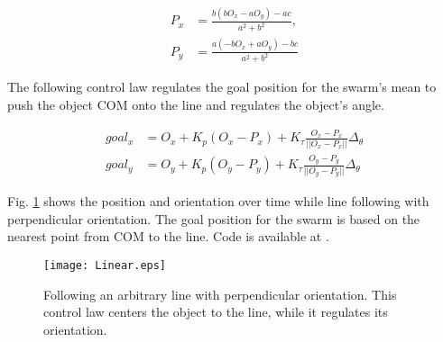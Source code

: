 
\begin{align}
P_x &= \frac{b(bO_x-aO_y)-ac}{a^2 + b^2},\\ \nonumber
P_y &= \frac{a(-bO_x+aO_y)-bc}{a^2 + b^2}
\end{align}


The following control law regulates the goal position for the swarm's mean to push the object COM onto the line and regulates the object's angle.

\begin{align}
goal_x &= O_x+ K_p (O_x-P_x)+ K_\tau \frac{O_x-P_x}{||O_x-P_x||}\Delta_{\theta} \nonumber \\
goal_y &= O_y+ K_p (O_y-P_y)+ K_\tau \frac{O_y-P_y}{||O_y-P_y||}\Delta_{\theta} \label{eq:Regulate}
\end{align}

Fig. \ref{fig:Linear} shows the position and orientation over time 
while line following with perpendicular orientation.
The goal position for the swarm is based on the nearest point from COM to the line.
 Code is available at \cite{Shahrokhi16TorqueLine}.

\begin{figure}
\begin{center}
	\texttt{[image: Linear.eps]}
\end{center}
\vspace{-1em}
\caption{\label{fig:Linear} 
Following an arbitrary line with perpendicular orientation. This control law centers the object to the line, while it regulates its orientation.
}
\vspace{-1em}
\end{figure}



